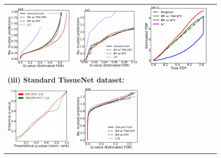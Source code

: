 \documentclass{article}
\begin{document}
\begin{figure}[h!]
\begin{tabular}{cccc}
		\includegraphics[width=1.7in]{img/cnn_pcam_balanced_fdr_control.png} & 
		\includegraphics[width=1.7in]{img/cnn_pcam_balanced_fdr_control_loc.png} &
		\includegraphics[width=1.7in]{img/cnn_FDPscat_pcam_balanced.png}\\
		\multicolumn{4}{l}{\bf (iii) Standard TissueNet dataset:}\\		
		\includegraphics[width=1.7in]{img/cnn_QQ_cells_segment.png} &
		\includegraphics[width=1.7in]{img/cnn_cells_segment_fdr_control.png} & 

\end{tabular}
\end{figure}
\end{document}
